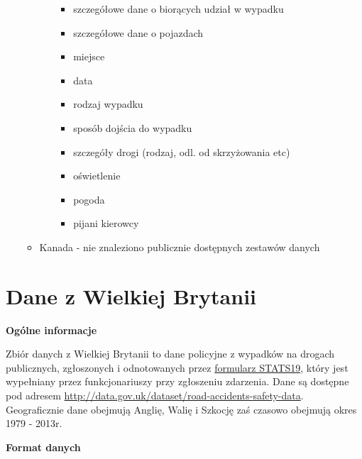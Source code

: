 \begin{enumerate}
\begin{itemize}
\begin{itemize}
      \begin{itemize}
      \itemsep1pt\parskip0pt
      \item
        szczegółowe dane o biorących udział w wypadku\\
      \item
        szczegółowe dane o pojazdach\\
      \item
        miejsce\\
      \item
        data\\
      \item
        rodzaj wypadku\\
      \item
        sposób dojścia do wypadku\\
      \item
        szczegóły drogi (rodzaj, odl. od skrzyżowania etc)\\
      \item
        oświetlenie\\
      \item
        pogoda\\
      \item
        pijani kierowcy\\
      \end{itemize}
    \end{itemize}
  \item
    Kanada - nie znaleziono publicznie dostępnych zestawów danych
  \end{itemize}
\end{enumerate}

\section{Dane z Wielkiej Brytanii}\label{dane-z-wielkiej-brytanii}

\textbf{Ogólne informacje}

Zbiór danych z Wielkiej Brytanii to dane policyjne z wypadków na drogach
publicznych, zgłoszonych i odnotowanych przez
\href{https://www.gov.uk/government/uploads/system/uploads/attachment_data/file/230590/stats19.pdf}{formularz
STATS19}, który jest wypełniany przez funkcjonariuszy przy zgłoszeniu
zdarzenia. Dane są dostępne pod adresem
\url{http://data.gov.uk/dataset/road-accidents-safety-data}.
Geograficznie dane obejmują Anglię, Walię i Szkocję zaś czasowo obejmują
okres 1979 - 2013r.

\textbf{Format danych}

